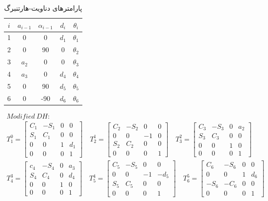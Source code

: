 \documentclass{article}
\begin{document}
\begin{table}
\begin{latin}
\begin{center}
\begin{tabular}{ c | c c c c }
 $i$ & $a_{i-1}$ & $\alpha_{i-1}$ & $d_{i}$ & $\theta_{i}$ \\ 
 \hline
 1 & 0 & 0 & $d_{1}$ & $\theta_{1}$ \\  
 2 & 0 & 90 & $0$ & $\theta_{2}$ \\ 
 3 & $a_{2}$ & 0 & $0$ & $\theta_{3}$ \\ 
 4 & $a_{3}$ & 0 & $d_{4}$ & $\theta_{4}$ \\ 
 5 & 0 & 90 & $d_{5}$ & $\theta_{5}$ \\ 
 6 & 0 & -90 & $d_{6}$ & $\theta_{6}$
 
\end{tabular}
\end{center}
\end{latin}
\caption{پارامترهای دناویت-هارتنبرگ}
\label{table:1}
\end{table}
\begin{gather*}
Modified\ DH: \\
T_{1}^{0} = \begin{bmatrix}
C_{1} & -S_{1} & 0 & 0 \\
S_{1} & C_{1} & 0 & 0 \\
0 & 0 & 1 & d_{1} \\
0 & 0 & 0 & 1
\end{bmatrix}
\quad
T_{2}^{1} = \begin{bmatrix}
C_{2} & -S_{2} & 0 & 0 \\
0 & 0 & -1 & 0 \\
S_{2} & C_{2} & 0 & 0 \\
0 & 0 & 0 & 1
\end{bmatrix}
\quad
T_{3}^{2} = \begin{bmatrix}
C_{3} & -S_{3} & 0 & a_{2} \\
S_{3} & C_{3} & 0 & 0 \\
0 & 0 & 1 & 0 \\
0 & 0 & 0 & 1
\end{bmatrix}
\\
T_{4}^{3} = \begin{bmatrix}
c_{4} & -S_{4} & 0 & a_{3} \\
S_{4} & C_{4} & 0 & d_{4} \\
0 & 0 & 1 & 0 \\
0 & 0 & 0 & 1
\end{bmatrix}
\quad
T_{5}^{4} = \begin{bmatrix}
C_{5} & -S_{5} & 0 & 0 \\
0 & 0 & -1 & -d_{5} \\
S_{5} & C_{5} & 0 & 0 \\
0 & 0 & 0 & 1
\end{bmatrix}
\quad
T_{6}^{5} = \begin{bmatrix}
C_{6} & -S_{6} & 0 & 0 \\
0 & 0 & 1 & d_{6} \\
-S_{6} & -C_{6} & 0 & 0 \\
0 & 0 & 0 & 1
\end{bmatrix}
\end{gather*}
\end{document}
